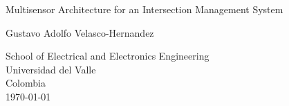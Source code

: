 \begin{titlepage}
    \begin{center}
        \vspace*{1cm}
        \Huge
        
        Multisensor Architecture for an Intersection Management System
    
        \vspace{4.5cm}
        \LARGE
        Gustavo Adolfo Velasco-Hernandez
        
        \vfill
        \large
        \vspace{0.8cm}
        
        
        School of Electrical and Electronics Engineering\\
        Universidad del Valle\\
        Colombia\\
        \today
        
    \end{center}
\end{titlepage}